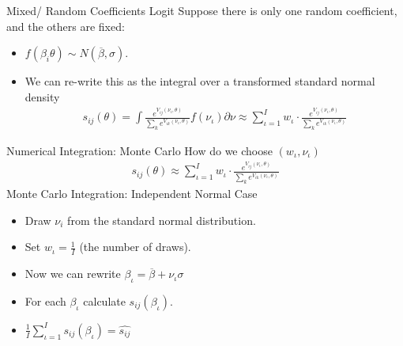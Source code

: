 %

\begin{frame}{Mixed/ Random Coefficients Logit}
Suppose there is only one random coefficient, and the others are fixed:
\begin{itemize}
\item $f(\beta_i \theta) \sim N(\overline{\beta},\sigma)$.
\item We can re-write this as the integral over a transformed standard normal density
\begin{align*}
s_{ij}(\theta) = \int \frac{ e^{V_{ij}(\nu_{\iota},\theta)}}{\sum_k e^{V_{ik}(\nu_{\iota},\theta)}} f(\nu_{\iota}) \partial \nu
\approx \sum_{\iota=1}^{I} w_{\iota} \cdot \frac{ e^{V_{ij}(\nu_{\iota},\theta)}}{\sum_k e^{V_{ik}(\nu_{\iota},\theta)}} 
\end{align*}
\end{itemize}
\end{frame}

\begin{frame}{Numerical Integration: Monte Carlo}
How do we choose $(w_{\iota}, \nu_{\iota})$
\begin{align*}
s_{ij}(\theta)
\approx \sum_{\iota=1}^{I} w_{\iota} \cdot \frac{ e^{V_{ij}(\nu_{\iota},\theta)}}{\sum_k e^{V_{ik}(\nu_{\iota},\theta)}} 
\end{align*}
Monte Carlo Integration: Independent Normal Case
\begin{itemize}
\item Draw $\nu_i$ from the standard normal distribution.
\item Set $w_{\iota} = \frac{1}{I}$ (the number of draws).
\item Now we can rewrite $\beta_{\iota} = \overline{\beta} + \nu_{\iota} \sigma$
\item For each $\beta_{\iota}$ calculate $s_{ij}(\beta_{\iota})$.
\item $\frac{1}{I} \sum_{\iota=1}^I s_{ij}(\beta_{\iota}) = \widehat{s_{ij}}$
\end{itemize}
\end{frame}


